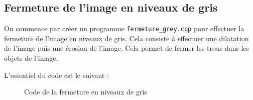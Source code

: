 \documentclass[french,a4paper,10pt]{article}
\begin{document}
	\newpage
	\subsection{Fermeture de l'image en niveaux de gris}\label{subsec:5.3}

	On commence par créer un programme \texttt{fermeture\_grey.cpp} pour effectuer la fermeture de l'image en niveaux
	de gris.
	Cela consiste à effectuer une dilatation de l'image puis une érosion de l'image.
	Cela permet de fermer les trous dans les objets de l'image.

	L'essentiel du code est le suivant : %
	\begin{figure}[!htb]
		\centering
		\caption{Code de la fermeture en niveaux de gris}\label{Fig:fermeture-grey-code}
	\end{figure}
\end{document}
